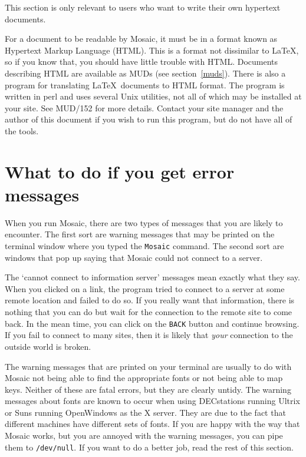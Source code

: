 This section is only relevant to users who want to write their own hypertext
documents.

For a document to be readable by Mosaic, it must be in a format known as
Hypertext Markup Language (HTML). This is a format not dissimilar to \LaTeX,
so if you know that, you should have little trouble with HTML. Documents
describing HTML are available as MUDs (see section~\ref{muds}). There is also a
program for translating \LaTeX\ documents to HTML format. The program is
written in perl and uses several Unix utilities, not all of which may be
installed at your site. See MUD/152 for more details. Contact your site manager
and the author of this document if you wish to run this program, but do not
have all of the tools.

\section{What to do if you get error messages}
\label{warnings}

When you run Mosaic, there are two types of messages that you are likely
to encounter. The first sort are warning messages that may be printed on the
terminal window where you typed the {\tt Mosaic} command. The second sort are
windows that pop up saying that Mosaic could not connect to a server.

The `cannot connect to information server' messages mean exactly what they say.
When you clicked on a link, the program tried to connect to a server at some
remote location and failed to do so. If you really want that information, there
is nothing that you can do but wait for the connection to the remote site to
come back. In the mean time, you can click on the {\tt BACK} button and
continue browsing. If you fail to connect to many sites, then it is likely that
{\em your} connection to the outside world is broken.

The warning messages that are printed on your terminal are usually to do with
Mosaic not being able to find the appropriate fonts or not being able to map
keys. Neither of these are fatal errors, but they are clearly untidy. The
warning messages about fonts are known to occur when using DECstations running
Ultrix or Suns running OpenWindows as the X server. 
They are due to the fact that different machines have different sets of fonts.
If you are happy with the way that Mosaic works, but you are annoyed with the
warning messages, you can pipe them to {\tt /dev/null}. If you want to do a
better job, read the rest of this section.

